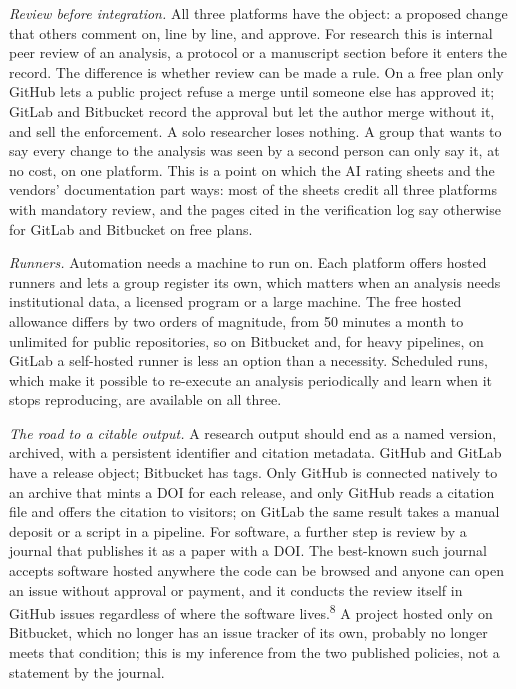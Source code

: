 \documentclass{IEEEcsmag}
\begin{document}
\emph{Review before integration.} All three platforms have the object: a proposed change that others comment on, line by line, and approve. For research this is internal peer review of an analysis, a protocol or a manuscript section before it enters the record. The difference is whether review can be made a rule. On a free plan only GitHub lets a public project refuse a merge until someone else has approved it; GitLab and Bitbucket record the approval but let the author merge without it, and sell the enforcement. A solo researcher loses nothing. A group that wants to say every change to the analysis was seen by a second person can only say it, at no cost, on one platform. This is a point on which the AI rating sheets and the vendors' documentation part ways: most of the sheets credit all three platforms with mandatory review, and the pages cited in the verification log say otherwise for GitLab and Bitbucket on free plans.

\emph{Runners.} Automation needs a machine to run on. Each platform offers hosted runners and lets a group register its own, which matters when an analysis needs institutional data, a licensed program or a large machine. The free hosted allowance differs by two orders of magnitude, from 50 minutes a month to unlimited for public repositories, so on Bitbucket and, for heavy pipelines, on GitLab a self-hosted runner is less an option than a necessity. Scheduled runs, which make it possible to re-execute an analysis periodically and learn when it stops reproducing, are available on all three.

\emph{The road to a citable output.} A research output should end as a named version, archived, with a persistent identifier and citation metadata. GitHub and GitLab have a release object; Bitbucket has tags. Only GitHub is connected natively to an archive that mints a DOI for each release, and only GitHub reads a citation file and offers the citation to visitors; on GitLab the same result takes a manual deposit or a script in a pipeline. For software, a further step is review by a journal that publishes it as a paper with a DOI. The best-known such journal accepts software hosted anywhere the code can be browsed and anyone can open an issue without approval or payment, and it conducts the review itself in GitHub issues regardless of where the software lives.\textsuperscript{8} A project hosted only on Bitbucket, which no longer has an issue tracker of its own, probably no longer meets that condition; this is my inference from the two published policies, not a statement by the journal.
\end{document}
